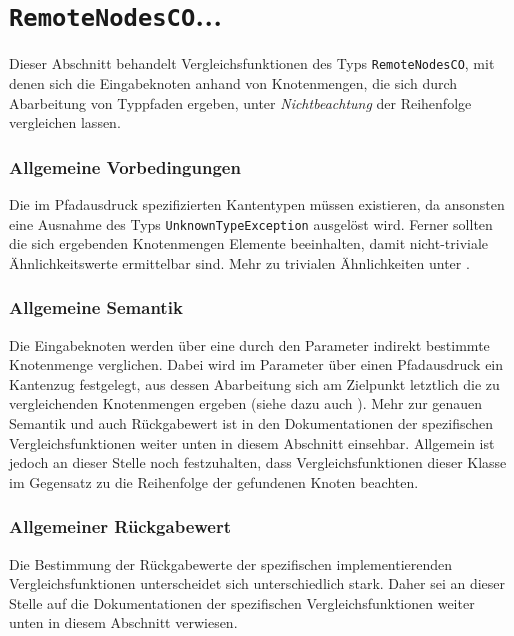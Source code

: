 %
%

\section{\texttt{RemoteNodesCO}...}
\label{strct:spec:remotenodesco}
Dieser Abschnitt behandelt Vergleichsfunktionen des Typs \texttt{RemoteNodesCO}, mit denen sich die Eingabeknoten anhand von Knotenmengen, die sich durch Abarbeitung von Typpfaden ergeben, unter \emph{Nichtbeachtung} der Reihenfolge vergleichen lassen.

\subsubsection*{Allgemeine Vorbedingungen}
Die im Pfadausdruck spezifizierten Kantentypen müssen existieren, da ansonsten eine Ausnahme des Typs \texttt{UnknownTypeException} ausgelöst wird. Ferner sollten die sich ergebenden Knotenmengen Elemente beeinhalten, damit nicht-triviale Ähnlichkeitswerte ermittelbar sind. Mehr zu trivialen Ähnlichkeiten unter .

\subsubsection*{Allgemeine Semantik}
Die Eingabeknoten werden über eine durch den Parameter indirekt bestimmte Knotenmenge verglichen. Dabei wird im Parameter über einen Pfadausdruck ein Kantenzug festgelegt, aus dessen Abarbeitung sich am Zielpunkt letztlich die zu vergleichenden Knotenmengen ergeben (siehe dazu auch ). Mehr zur genauen Semantik und auch Rückgabewert ist in den Dokumentationen der spezifischen Vergleichsfunktionen weiter unten in diesem Abschnitt einsehbar. Allgemein ist jedoch an dieser Stelle noch festzuhalten, dass Vergleichsfunktionen dieser Klasse im Gegensatz zu  die Reihenfolge der gefundenen Knoten beachten.

\subsubsection*{Allgemeiner Rückgabewert}
Die Bestimmung der Rückgabewerte der spezifischen implementierenden Vergleichsfunktionen unterscheidet sich unterschiedlich stark. Daher sei an dieser Stelle auf die Dokumentationen der spezifischen Vergleichsfunktionen weiter unten in diesem Abschnitt verwiesen.

